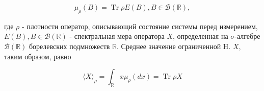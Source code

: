 \documentclass[10pt]{article}
\begin{document}
\[

\mu_{\rho}(B)=\operatorname{Tr} \rho E(B), B \in \mathscr{B}(\mathbb{R}),

\]



где $\rho$ - плотности оператор, описывающий состояние системы перед измерением, $E(B), B \in \mathscr{B}(\mathbb{R})$ - спектральная мера оператора $X$, определенная на $\sigma$-алгебре $\mathscr{B}(\mathbb{R})$ борелевских подмножеств $\mathbb{R}$. Среднее значение ограниченной $\mathrm{H}$. $X$, таким образом, равно



\[

\langle X\rangle_{\rho}=\int_{\mathbb{R}} x \mu_{\rho}(d x)=\operatorname{Tr} \rho X

\]
\end{document}
